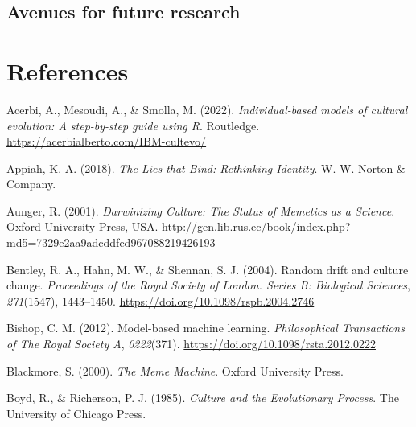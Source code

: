 \documentclass[
  a4paperpaper,
  ,captions=tableheading
]{scrbook}
\newlength{\cslhangindent}
\newlength{\cslentryspacingunit} %
\newenvironment{CSLReferences}[2] %
 {%
  \setlength{\parindent}{0pt}
  \ifodd #1
  \let\oldpar\par
  \def\par{\hangindent=\cslhangindent\oldpar}
  \fi
  \setlength{\parskip}{#2\cslentryspacingunit}
 }%
 {}
\begin{document}
\hypertarget{avenues-for-future-research}{%
\section{Avenues for future
research}\label{avenues-for-future-research}}


\hypertarget{references}{%
\chapter*{References}\label{references}}


\hypertarget{refs}{}
\begin{CSLReferences}{1}{0}
\leavevmode{}%
Acerbi, A., Mesoudi, A., \& Smolla, M. (2022). \emph{{Individual-based
models of cultural evolution: A step-by-step guide using {R}}}.
Routledge. \url{https://acerbialberto.com/IBM-cultevo/}

\leavevmode{}%
Appiah, K. A. (2018). \emph{The {Lies} that {Bind}: {Rethinking
Identity}}. {W. W. Norton \& Company}.

\leavevmode{}%
Aunger, R. (2001). \emph{Darwinizing {Culture}: {The Status} of
{Memetics} as a {Science}}. {Oxford University Press, USA}.
\url{http://gen.lib.rus.ec/book/index.php?md5=7329e2aa9adcddfed967088219426193}

\leavevmode{}%
Bentley, R. A., Hahn, M. W., \& Shennan, S. J. (2004). Random drift and
culture change. \emph{Proceedings of the Royal Society of London. Series
B: Biological Sciences}, \emph{271}(1547), 1443--1450.
\url{https://doi.org/10.1098/rspb.2004.2746}

\leavevmode{}%
Bishop, C. M. (2012). Model-based machine learning. \emph{Philosophical
Transactions of The Royal Society A}, \emph{0222}(371).
\url{https://doi.org/10.1098/rsta.2012.0222}

\leavevmode{}%
Blackmore, S. (2000). \emph{The {Meme Machine}}. {Oxford University
Press}.

\leavevmode{}%
Boyd, R., \& Richerson, P. J. (1985). \emph{{Culture and the
Evolutionary Process}}. The University of Chicago Press.


\end{CSLReferences}
\end{document}
